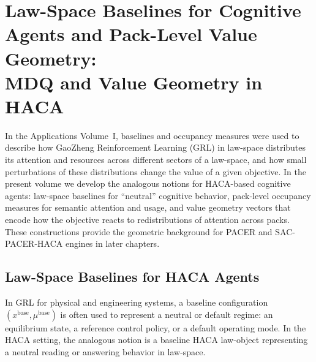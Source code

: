 \documentclass[11pt]{book}
\theoremstyle{plain}
\theoremstyle{definition}
\theoremstyle{remark}
\begin{document}
\chapter[Law-Space Baselines for Cognitive Agents and Pack-Level Value Geometry]{Law-Space Baselines for Cognitive Agents and Pack-Level Value Geometry:\\
         MDQ and Value Geometry in HACA}
In the Applications Volume~I, baselines and occupancy measures were used
to describe how GaoZheng Reinforcement Learning (GRL) in law-space
distributes its attention and resources across different sectors of a
law-space, and how small perturbations of these distributions change the
value of a given objective. In the present volume we develop the
analogous notions for HACA-based cognitive agents: law-space baselines
for ``neutral'' cognitive behavior, pack-level occupancy measures for
semantic attention and usage, and value geometry vectors that encode how
the objective reacts to redistributions of attention across packs. These
constructions provide the geometric background for PACER and
SAC-PACER-HACA engines in later chapters.

\section[Law-Space Baselines for HACA Agents]{Law-Space Baselines for HACA Agents}


In GRL for physical and engineering systems, a baseline configuration
$(x^{\mathrm{base}},\mu^{\mathrm{base}})$ is often used to represent a
neutral or default regime: an equilibrium state, a reference control
policy, or a default operating mode. In the HACA setting, the analogous
notion is a baseline HACA law-object representing a neutral reading or
answering behavior in law-space.
\end{document}
